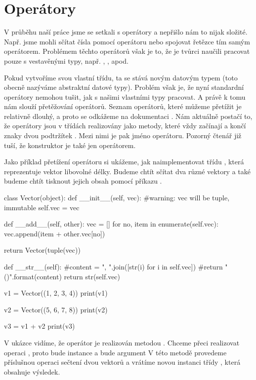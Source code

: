 \section{Operátory}

V průběhu naší práce jsme se setkali s operátory a nepřišlo nám to nijak složité. Např. jsme mohli sčítat
čísla pomocí operátoru \kod{+} nebo spojovat řetězce tím samým operátorem. Problémem těchto operátorů však
je to, že je tvůrci naučili pracovat pouze s vestavěnými typy, např. , , apod.

Pokud vytvoříme svou vlastní třídu, ta se stává novým datovým typem (toto obecně nazýváme abstraktní datové
typy). Problém však je, že nyní standardní operátory nemohou tušit, jak s našimi vlastními typy pracovat.
A právě k tomu nám slouží přetěžování operátorů. Seznam operátorů, které můžeme přetížit je relativně dlouhý,
a proto se odkážeme na dokumentaci \cite{python-operator-overloading}. Nám aktuálně postačí to, že operátory
jsou v třídách realizovány jako metody, které vždy začínají a končí znaky dvou podtržítek \kod{\_\_}.
Mezi nimi je pak jméno operátoru. Pozorný čtenář již tuší, že konstruktor je také jen operátorem.

Jako příklad přetížení operátoru si ukážeme, jak naimplementovat třídu , která reprezentuje
vektor libovolné délky. Budeme chtít sčítat dva různé vektory a také budeme chtít tisknout jejich obsah
pomocí příkazu .

\begin{python}
class Vector(object):
    def __init__(self, vec):
        #warning: vec will be tuple, immutable
        self.vec = vec

    def __add__(self, other):
        vec = []
        for no, item in enumerate(self.vec):
            vec.append(item + other.vec[no])

        return Vector(tuple(vec))

    def __str__(self):
        #content = ", ".join([str(i) for i in self.vec])
        #return "({})".format(content)
        return str(self.vec)

v1 = Vector((1, 2, 3, 4))
print(v1)

v2 = Vector((5, 6, 7, 8))
print(v2)

v3 = v1 + v2
print(v3)
\end{python}

V ukázce vidíme, že operátor \kod{+} je realizován metodou .
 Chceme přeci realizovat operaci , proto 
bude instance  a  bude argument 
V této metodě provedeme příslušnou operaci sečtení dvou vektorů a vrátíme novou instanci třídy ,
která obsahuje výsledek.

